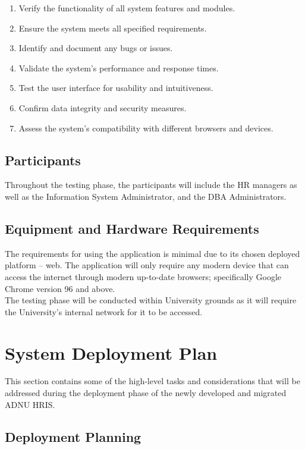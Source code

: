     \begin{enumerate}
        \item Verify the functionality of all system features and modules.
        \item Ensure the system meets all specified requirements.
        \item Identify and document any bugs or issues.
        \item Validate the system's performance and response times.
        \item Test the user interface for usability and intuitiveness.
        \item Confirm data integrity and security measures.
        \item Assess the system's compatibility with different browsers and devices.
    \end{enumerate}

    \subsection{Participants}

    Throughout the testing phase, the participants will include the HR managers as well as the Information System Administrator, and the DBA Administrators.

    \subsection{Equipment and Hardware Requirements}

    The requirements for using the application is minimal due to its chosen deployed platform -- web. The application will only require any modern device that can access the internet through modern up-to-date browsers; specifically Google Chrome version 96 and above. 
    \\ 
    
    The testing phase will be conducted within University grounds as it will require the University's internal network for it to be accessed. 

\section{System Deployment Plan}

This section contains some of the high-level tasks and considerations that will be addressed during the deployment phase of the newly developed and migrated ADNU HRIS.

    \subsection{Deployment Planning}
        
